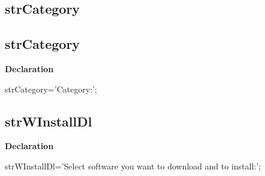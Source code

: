 \documentclass{report}
\newif\ifpdf
\begin{document}
\subsection*{\large{\textbf{strCategory}}\normalsize\hspace{1ex}\hrulefill}
\else
\subsection*{strCategory}
\fi
\label{trstrings-strCategory}
\begin{list}{}{
\setlength{\itemindent}{0cm}
\setlength{\listparindent}{0cm}
\setlength{\leftmargin}{\evensidemargin}
\addtolength{\leftmargin}{\tmplength}
\settowidth{\labelsep}{X}
\addtolength{\leftmargin}{\labelsep}
\setlength{\labelwidth}{\tmplength}
}
\item[\textbf{Declaration}\hfill]
\ifpdf
\begin{flushleft}
\fi
\begin{ttfamily}
strCategory='Category:';\end{ttfamily}

\ifpdf
\end{flushleft}
\fi

\end{list}
\ifpdf
\subsection*{\large{\textbf{strWInstallDl}}\normalsize\hspace{1ex}\hrulefill}
\else
\subsection*{strWInstallDl}
\fi
\label{trstrings-strWInstallDl}
\begin{list}{}{
\setlength{\itemindent}{0cm}
\setlength{\listparindent}{0cm}
\setlength{\leftmargin}{\evensidemargin}
\addtolength{\leftmargin}{\tmplength}
\settowidth{\labelsep}{X}
\addtolength{\leftmargin}{\labelsep}
\setlength{\labelwidth}{\tmplength}
}
\item[\textbf{Declaration}\hfill]
\ifpdf
\begin{flushleft}
\fi
\begin{ttfamily}
strWInstallDl='Select software you want to download and to install:';\end{ttfamily}

\ifpdf
\end{flushleft}
\fi

\end{list}
\ifpdf
\end{document}
